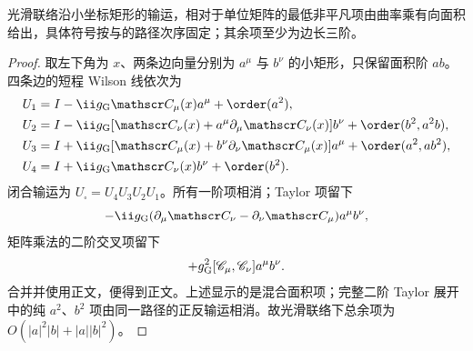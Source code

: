 \begin{proposition}[小回路与曲率]
光滑联络沿小坐标矩形的输运，相对于单位矩阵的最低非平凡项由曲率乘有向面积给出，具体符号按与的路径次序固定；其余项至少为边长三阶。
\end{proposition}
\begin{proof}
取左下角为 $x$、两条边向量分别为 $a^\mu$ 与 $b^\nu$ 的小矩形，只保留面积阶 $ab$。四条边的短程 Wilson 线依次为
\begin{align*}
 U_1&=I-\ii g_{\rm G}\mathscr C_\mu(x)a^\mu+\order(a^2),\\
 U_2&=I-\ii g_{\rm G}[\mathscr C_\nu(x)+a^\mu\partial_\mu\mathscr C_\nu(x)]b^\nu
 +\order(b^2,a^2b),\\
 U_3&=I+\ii g_{\rm G}[\mathscr C_\mu(x)+b^\nu\partial_\nu\mathscr C_\mu(x)]a^\mu
 +\order(a^2,ab^2),\\
 U_4&=I+\ii g_{\rm G}\mathscr C_\nu(x)b^\nu+\order(b^2).
\end{align*}
闭合输运为 $U_\square=U_4U_3U_2U_1$。所有一阶项相消；Taylor 项留下
\begin{equation*}
 -\ii g_{\rm G}(\partial_\mu\mathscr C_\nu-\partial_\nu\mathscr C_\mu)a^\mu b^\nu,
\end{equation*}
矩阵乘法的二阶交叉项留下
\begin{equation*}
  +g_{\rm G}^2[\mathscr C_\mu,\mathscr C_\nu]a^\mu b^\nu.
\end{equation*}
合并并使用正文，便得到正文。上述显示的是混合面积项；完整二阶 Taylor 展开中的纯 $a^2$、$b^2$ 项由同一路径的正反输运相消。故光滑联络下总余项为 $O(|a|^2|b|+|a||b|^2)$。
\end{proof}

